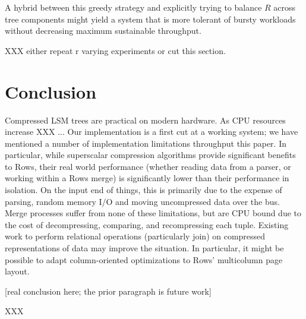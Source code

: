 \documentclass{sig-alternate-sigmod08}
\newcommand{\rows}{Rows\xspace}
\newcommand{\rowss}{Rows'\xspace}
\begin{document}
A hybrid between this greedy strategy and explicitly trying to balance
$R$ across tree components might yield a system that is more tolerant
of bursty workloads without decreasing maximum sustainable throughput.

XXX either repeat r varying experiments or cut this section.

\section{Conclusion}

Compressed LSM trees are practical on modern hardware.  As CPU
resources increase XXX ... Our implementation is a first cut at a
working system; we have mentioned a number of implementation
limitations throughput this paper.  In particular, while superscalar
compression algorithms provide significant benefits to \rows, their
real world performance (whether reading data from a parser, or working
within a \rows merge) is significantly lower than their performance in
isolation.  On the input end of things, this is primarily due to the
expense of parsing, random memory I/O and moving uncompressed data
over the bus.  Merge processes suffer from none of these limitations,
but are CPU bound due to the cost of decompressing, comparing, and
recompressing each tuple.  Existing work to perform relational
operations (particularly join) on compressed representations of data
may improve the situation.  In particular, it might be possible to
adapt column-oriented optimizations to \rowss multicolumn page layout.

[real conclusion here; the prior paragraph is future work]


XXX\cite{bowman:reasoning}


%
%
\balancecolumns %
\end{document}
